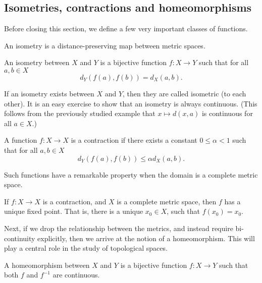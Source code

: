 

\subsection{Isometries, contractions and homeomorphisms}
Before closing this section, we define a few very important classes of functions.

An isometry is a distance-preserving map between metric spaces.
\begin{ndfn}[Isometry]
  An isometry between $X$ and $Y$ is a bijective function $f:X \to Y$ such that for all $a,b \in X$
  \begin{equation*}
    d_{Y}(f(a), f(b)) = d_{X}(a, b).
  \end{equation*}
\end{ndfn}
If an isometry exists between $X$ and $Y$, then they are called isometric (to each other). It is an easy exercise to show that an isometry is always continuous. (This follows from the previously studied example that $x \mapsto d(x,a)$ is continuous for all $a \in X$.)

\begin{ndfn}[Contraction]
  A function $f:X \to X$ is a contraction if there exists a constant $0 \leq \alpha < 1$ such that for all $a,b \in X$
  \begin{equation*}
    d_{Y}(f(a), f(b)) \leq \alpha d_{X}(a, b).
  \end{equation*}
\end{ndfn}
Such functions have a remarkable property when the domain is a complete metric space.
\begin{nthm}
  If $f: X \to X$ is a contraction, and $X$ is a complete metric space, then $f$ has a unique fixed point. That is, there is a unique $x_0 \in X$, such that $f(x_0) = x_0$.
\end{nthm}

Next, if we drop the relationship between the metrics, and instead require bi-continuity explicitly, then we arrive at the notion of a homeomorphism. This will play a central role in the study of topological spaces.
\begin{ndfn}[Homeomorphism]\label{def:homeomorphism}
  A homeomorphism between $X$ and $Y$ is a bijective function $f:X \to Y$ such that both $f$ and $f^{-1}$ are continuous.
\end{ndfn}

